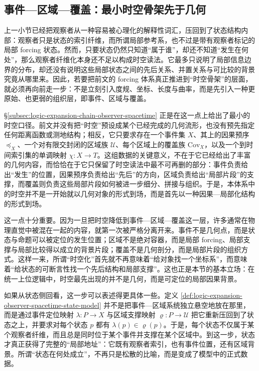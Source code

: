 \subsection{事件—区域—覆盖：最小时空骨架先于几何}\label{subsec:physical-spacetime-skeleton-event-region-cover}

上一小节已经把观察者从一种容易被心理化的解释性词汇，压回到了状态结构内部：观察者只是状态的索引纤维，而所谓局部参考系，也不过是带有观察者标记的局部 forcing 状态。然而，只要状态仍然只知道“属于谁”，却还不知道“发生在何处”，那么观察者纤维化本身还不足以构成时空读法。它最多只说明了局部信息边界的分布，却还没有说明这些局部状态之间的先后关系、并置关系与可比较的背景究竟从哪里来。因此，若要把前文的 forcing 体系真正推进到“时空骨架”的层面，就必须再向前走一步：不是立刻引入度规、坐标、长度与曲率，而是先引入一种更原始、也更弱的组织层，即事件、区域与覆盖。

\S\ref{subsec:logic-expansion-chain-observer-spacetime} 正是在这一点上给出了最小的时空口径。前文并没有把“时空”预设成某个已经完成的几何流形，也没有预先指定任何距离函数或测地结构；相反，它只要求存在一个事件集 \(X\)、其上的因果预序 \(\preceq_X\)、一个对有限交封闭的区域族 \(\mathcal U\)、每个区域上的覆盖族 \(\mathrm{Cov}_X\)，以及一个到时间索引集的单调映射 \(\chi:X\to T\)。这组数据的关键意义，不在于它已经给出了丰富的几何内容，而恰恰在于它只保留了时空读法中最不可再删的部分：事件负责给出“发生”的位置，因果预序负责给出“先后”的方向，区域负责给出“局部片段”的支撑，而覆盖则负责这些局部片段如何被进一步细分、拼接与组织。于是，本体系中的时空并不是一开始就以几何对象的形式到场，而是首先以一种因果—局部化结构的形式到场。

这一点十分重要。因为一旦把时空降低到事件—区域—覆盖这一层，许多通常在物理直觉中被混在一起的内容，就第一次被严格分离开来。事件不是几何点，而是状态与命题可以被定位的发生位置；区域不是绝对容器，而是局部 forcing、局部支撑与局部比较得以成立的背景片段；覆盖不是几何剖分，而是局部片段的组织方式。这样一来，所谓“时空化”首先就不再意味着“给对象找一个坐标系”，而意味着“给状态的可断言性找一个先后结构和局部支撑”。这也正是本节的基本立场：在统一上位逻辑中，时空最先出现的并不是几何，而是可定位的局部因果背景。

如果从状态侧回看，这一步可以表述得更具体一些。定义 \ref{def:logic-expansion-observer-spacetime-state-model} 并不是把事件—区域系统独立悬空地放在那里，而是通过事件定位映射 \(\lambda:P\to X\) 与区域支撑映射 \(\varrho:P\to\mathcal U\) 把它重新压回到了状态之上，并要求对每个状态 \(p\) 都有 \(\lambda(p)\in\varrho(p)\)。于是，每个状态不仅属于某个观察者纤维，而且总是同时位于某个事件并支撑在某个区域中。到这一步，状态才真正获得了完整的“局部地址”：它既有观察者索引，也有事件位置，还有区域背景。所谓“状态在何处成立”，不再只是松散的比喻，而是变成了模型中的正式数据。

